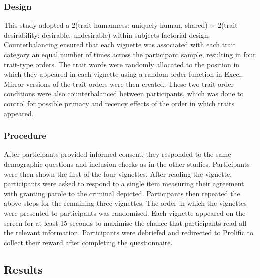\documentclass[
]{article}
\begin{document}
\hypertarget{design-3}{%
\subsubsection{Design}\label{design-3}}

This study adopted a 2(trait humanness: uniquely human, shared) \(\times\) 2(trait desirability: desirable, undesirable) within-subjects factorial design. Counterbalancing ensured that each vignette was associated with each trait category an equal number of times across the participant sample, resulting in four trait-type orders. The trait words were randomly allocated to the position in which they appeared in each vignette using a random order function in Excel. Mirror versions of the trait orders were then created. These two trait-order conditions were also counterbalanced between participants, which was done to control for possible primacy and recency effects of the order in which traits appeared.

\hypertarget{procedure-3}{%
\subsubsection{Procedure}\label{procedure-3}}

After participants provided informed consent, they responded to the same demographic questions and inclusion checks as in the other studies. Participants were then shown the first of the four vignettes. After reading the vignette, participants were asked to respond to a single item measuring their agreement with granting parole to the criminal depicted. Participants then repeated the above steps for the remaining three vignettes. The order in which the vignettes were presented to participants was randomised. Each vignette appeared on the screen for at least 15 seconds to maximise the chance that participants read all the relevant information. Participants were debriefed and redirected to Prolific to collect their reward after completing the questionnaire.

\hypertarget{results-4}{%
\subsection{Results}\label{results-4}}
\end{document}
